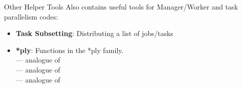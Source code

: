 \begin{frame}
  \begin{block}{Other Helper Tools}\pause
   Also contains useful tools for Manager/Worker and task parallelism codes:
    \begin{itemize}
      \item \textbf{Task Subsetting}: Distributing a list of jobs/tasks\\ 
      \item \textbf{*ply}:  Functions in the *ply family.\\
       --- analogue of \\
       --- analogue of \\
       --- analogue of \\
    \end{itemize}
  \end{block}
\end{frame}



